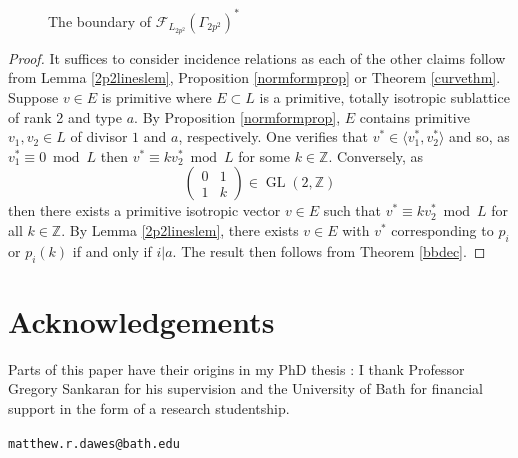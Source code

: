\documentclass[11pt]{article}
\newcommand{\ZZ}{\mathbb{Z}}
\newcommand{\cc}{\mathcal{C}}
\newcommand{\fc}{\mathcal{F}}
\newcommand{\la}{\langle}
\newcommand{\ra}{\rangle}
\newcommand{\opn}{\operatorname}
\newcommand{\beq}{\begin{equation*}}
\newcommand{\eeq}{\end{equation*}}
\newcommand{\bpm}{\begin{pmatrix}}
\newcommand{\epm}{\end{pmatrix}}
\begin{document}
\begin{figure}[h!]
\caption{The boundary of $\fc_{L_{2p^2}}(\Gamma_{2p^2})^*$}\label{boundaryfp2}
\end{figure}
\begin{proof}
  It suffices to consider incidence relations as each of the other claims follow from Lemma \ref{2p2lineslem}, Proposition \ref{normformprop} or Theorem \ref{curvethm}. 
  Suppose $v \in E$ is primitive where $E \subset L$ is a primitive, totally isotropic sublattice of rank 2 and type $a$.
  By Proposition \ref{normformprop}, $E$ contains primitive  $v_1, v_2 \in L$ of  divisor $1$ and $a$, respectively.
  One verifies that $v^* \in \la v_1^*, v_2^* \ra$ and so, as $v_1^* \equiv 0 \bmod {L}$ then $v^* \equiv kv_2^* \bmod{ L}$ for some $k \in \ZZ$.
  Conversely, as
  \beq
  \bpm
  0 & 1 \\
  1 & k
  \epm \in \opn{GL}(2, \ZZ)
  \eeq
  then there exists a primitive isotropic vector $v \in E$ such that $v^* \equiv k v_2^* \bmod{ L}$ for all $k \in \ZZ$.
  By Lemma \ref{2p2lineslem}, there exists $v \in E$ with $v^*$ corresponding to $p_i$ or $p_i(k)$ if and only if $i \vert a$.
  The result then follows from Theorem \ref{bbdec}.
\end{proof}
\section{Acknowledgements}
Parts of this paper have their origins in my PhD thesis \cite{DawesThesis}: 
I thank Professor Gregory Sankaran for his supervision and the University of Bath for financial support in the form of a research studentship.
{\small

{}
}
\bigskip
\texttt{matthew.r.dawes@bath.edu}
\end{document}
